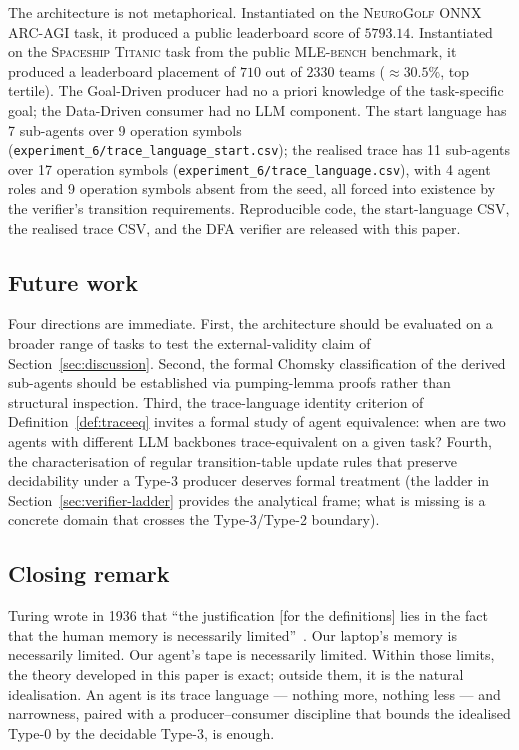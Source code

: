 The architecture is not metaphorical.  Instantiated on the
\textsc{NeuroGolf ONNX ARC-AGI} task, it produced a public
leaderboard score of $5793.14$.  Instantiated on the
\textsc{Spaceship Titanic} task from the public
\textsc{MLE-bench} benchmark, it produced a leaderboard placement
of $710$ out of $2330$ teams ($\approx\!30.5\%$, top tertile).
The Goal-Driven producer had no a priori knowledge of the task-specific
goal; the Data-Driven consumer had no LLM component.  The start
language has 7 sub-agents over 9 operation symbols
(\texttt{experiment\_6/trace\_language\_start.csv}); the realised
trace has 11 sub-agents over 17 operation symbols
(\texttt{experiment\_6/trace\_language.csv}), with 4 agent roles
and 9 operation symbols absent from the seed, all forced into
existence by the verifier's transition requirements.  Reproducible
code, the start-language CSV, the realised trace CSV, and the DFA
verifier are released with this paper.

\subsection{Future work}

Four directions are immediate.  First, the architecture should
be evaluated on a broader range of tasks to test the
external-validity claim of Section~\ref{sec:discussion}.  Second,
the formal Chomsky classification of the derived sub-agents should
be established via pumping-lemma proofs rather than structural
inspection.  Third, the trace-language identity criterion of
Definition~\ref{def:traceeq} invites a formal study of agent
equivalence: when are two agents with different LLM backbones
trace-equivalent on a given task?  Fourth, the characterisation
of regular transition-table update rules that preserve decidability
under a Type-3 producer deserves formal treatment (the ladder in
Section~\ref{sec:verifier-ladder} provides the analytical frame;
what is missing is a concrete domain that crosses the
Type-3/Type-2 boundary).

\subsection{Closing remark}

Turing wrote in 1936 that ``the justification [for the
definitions] lies in the fact that the human memory is
necessarily limited''~\cite{turing1936computable}.  Our laptop's
memory is necessarily limited.  Our agent's tape is necessarily
limited.  Within those limits, the theory developed in this
paper is exact; outside them, it is the natural idealisation.
An agent is its trace language --- nothing more, nothing less ---
and narrowness, paired with a producer--consumer discipline that
bounds the idealised Type-0 by the decidable Type-3, is enough.
